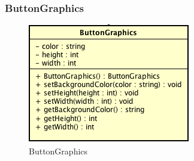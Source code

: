 \subsubsection{ButtonGraphics}

\label{ButtonGraphics}
\begin{figure}[ht]
	\centering
	\includegraphics[scale=0.5]{Sezioni/SottosezioniST/img/ButtonGraphics.png}
	\caption{ButtonGraphics}
\end{figure}

